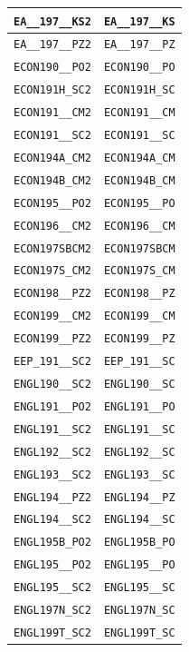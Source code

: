\begin{longtable}{|p{4.4in}|p{4.4in}|}
    \verb|EA__197__KS2| & \verb|EA__197__KS|\\\hline
    \verb|EA__197__PZ2| & \verb|EA__197__PZ|\\\hline
    \verb|ECON190__PO2| & \verb|ECON190__PO|\\\hline
    \verb|ECON191H_SC2| & \verb|ECON191H_SC|\\\hline
    \verb|ECON191__CM2| & \verb|ECON191__CM|\\\hline
    \verb|ECON191__SC2| & \verb|ECON191__SC|\\\hline
    \verb|ECON194A_CM2| & \verb|ECON194A_CM|\\\hline
    \verb|ECON194B_CM2| & \verb|ECON194B_CM|\\\hline
    \verb|ECON195__PO2| & \verb|ECON195__PO|\\\hline
    \verb|ECON196__CM2| & \verb|ECON196__CM|\\\hline
    \verb|ECON197SBCM2| & \verb|ECON197SBCM|\\\hline
    \verb|ECON197S_CM2| & \verb|ECON197S_CM|\\\hline
    \verb|ECON198__PZ2| & \verb|ECON198__PZ|\\\hline
    \verb|ECON199__CM2| & \verb|ECON199__CM|\\\hline
    \verb|ECON199__PZ2| & \verb|ECON199__PZ|\\\hline
    \verb|EEP_191__SC2| & \verb|EEP_191__SC|\\\hline
    \verb|ENGL190__SC2| & \verb|ENGL190__SC|\\\hline
    \verb|ENGL191__PO2| & \verb|ENGL191__PO|\\\hline
    \verb|ENGL191__SC2| & \verb|ENGL191__SC|\\\hline
    \verb|ENGL192__SC2| & \verb|ENGL192__SC|\\\hline
    \verb|ENGL193__SC2| & \verb|ENGL193__SC|\\\hline
    \verb|ENGL194__PZ2| & \verb|ENGL194__PZ|\\\hline
    \verb|ENGL194__SC2| & \verb|ENGL194__SC|\\\hline
    \verb|ENGL195B_PO2| & \verb|ENGL195B_PO|\\\hline
    \verb|ENGL195__PO2| & \verb|ENGL195__PO|\\\hline
    \verb|ENGL195__SC2| & \verb|ENGL195__SC|\\\hline
    \verb|ENGL197N_SC2| & \verb|ENGL197N_SC|\\\hline
    \verb|ENGL199T_SC2| & \verb|ENGL199T_SC|\\\hline

\end{longtable}
